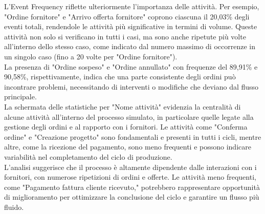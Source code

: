 \documentclass{article}
\begin{document}
L'Event Frequency riflette ulteriormente l'importanza delle attività. Per esempio, "Ordine fornitore" e "Arrivo offerta fornitore" coprono ciascuna il 20,03\% degli eventi totali, rendendole le attività più significative in termini di volume. Queste attività non solo si verificano in tutti i casi, ma sono anche ripetute più volte all'interno dello stesso caso, come indicato dal numero massimo di occorrenze in un singolo caso (fino a 20 volte per "Ordine fornitore").\\
La presenza di "Ordine sospeso" e "Ordine annullato" con frequenze del 89,91\% e 90,58\%, rispettivamente, indica che una parte consistente degli ordini può incontrare problemi, necessitando di interventi o modifiche che deviano dal flusso principale.\\
La schermata delle statistiche per "Nome attività" evidenzia la centralità di alcune attività all'interno del processo simulato, in particolare quelle legate alla gestione degli ordini e al rapporto con i fornitori. Le attività come "Conferma ordine" e "Creazione progetto" sono fondamentali e presenti in tutti i cicli, mentre altre, come la ricezione del pagamento, sono meno frequenti e possono indicare variabilità nel completamento del ciclo di produzione.\\
L'analisi suggerisce che il processo è altamente dipendente dalle interazioni con i fornitori, con numerose ripetizioni di ordini e offerte. Le attività meno frequenti, come "Pagamento fattura cliente ricevuto," potrebbero rappresentare opportunità di miglioramento per ottimizzare la conclusione del ciclo e garantire un flusso più fluido.
\end{document}
